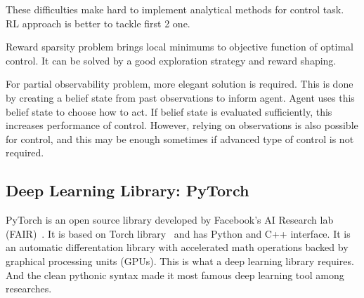These difficulties make hard to implement analytical methods for control task. 
RL approach is better to tackle first 2 one. 

Reward sparsity problem brings local minimums to objective function of optimal control. It can be solved by a good exploration strategy and reward shaping. 

For partial observability problem, more elegant solution is required. 
This is done by creating a belief state from past observations to inform agent. 
Agent uses this belief state to choose how to act. 
If belief state is evaluated sufficiently, 
this increases performance of control.
However, relying on observations is also possible for control, 
and this may be enough sometimes if advanced type of control is not required. 

\subsection{Deep Learning Library: PyTorch}
\label{dl_pytorch}
PyTorch is an open source library developed by Facebook's AI Research lab (FAIR)~\cite{paszke_pytorch_2019}. 
It is based on Torch library~\cite{collobert_torch7_2011} and has Python and C++ interface. 
It is an automatic differentation library with accelerated math operations backed by graphical processing units (GPUs). 
This is what a deep learning library requires. 
And the clean pythonic syntax made it most famous deep learning tool among researches. 
